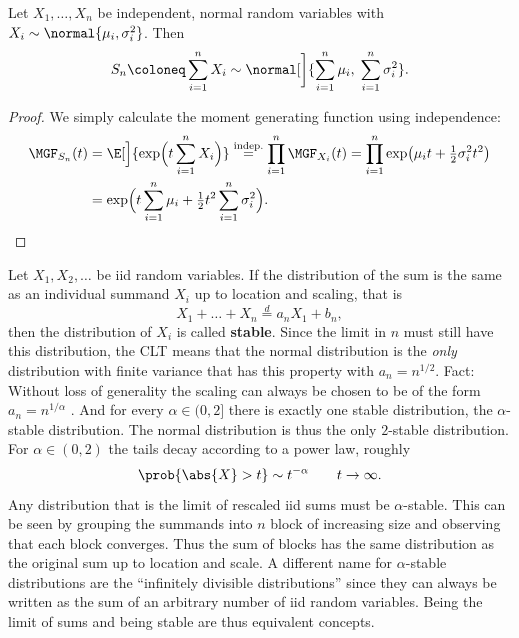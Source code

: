 \begin{lemma}
    \label{lem: sum stability of normal distribution}
    Let \(X_1,\dots, X_n\) be independent, normal random variables with \(X_i
    \sim \normal{\mu_i, \sigma_i^2}\). Then
    \[
        S_n \coloneq \sum_{i=1}^n X_i \sim \normal[\bigg]{\sum_{i=1}^n \mu_i,\; \sum_{i=1}^n \sigma_i^2}.
    \]
\end{lemma}
\begin{proof}
    We simply calculate the moment generating function using independence:
    \[\begin{aligned}[b]
        \MGF_{S_n}(t)
        &= \E[\Big]{\exp\Bigl(t \sum_{i=1}^n X_i\Bigr)}
        \overset{\text{indep.}}= \prod_{i=1}^n \MGF_{X_i}(t)
        = \prod_{i=1}^n \exp\bigl(\mu_i t + \tfrac12 \sigma_i^2 t^2\bigr)
        \\
        &= \exp\Bigl(t \sum_{i=1}^n \mu_i + \tfrac12 t^2 \sum_{i=1}^n \sigma_i^2\Bigr).
    \end{aligned}
    \qedhere
    \]
\end{proof}

\begin{remark}
    Let \(X_1, X_2, \dots\) be iid random variables.  If the distribution of the
    sum is the same as an individual summand \(X_i\) up to location and scaling,
    that is
    \[
        X_1 + \dots + X_n \overset{d} = a_n X_1 + b_n,
    \]
    then the distribution of \(X_i\) is called \textbf{stable}. Since 
    the limit in \(n\) must still have this distribution, the CLT means that the
    normal distribution is the \emph{only} distribution with finite variance
    that has this property with \(a_n = n^{1/2}\). Fact: Without loss of generality the scaling can
    always be chosen to be of the form \(a_n = n^{1/\alpha}\) \citep[Thm.~16.22]{klenkeProbabilityTheoryComprehensive2014}.
    And for every \(\alpha\in (0, 2]\) there is exactly one stable distribution,
    the \(\alpha\)-stable distribution. The normal distribution is thus the
    only \(2\)-stable distribution. For \(\alpha\in (0,2)\) the tails
    decay according to a power law, roughly
    \[
        \prob{\abs{X} >t} \sim t^{-\alpha} \qquad t\to \infty.
    \]
    Any distribution that is the limit of rescaled iid sums must be
    \(\alpha\)-stable. This can be seen by grouping the summands into \(n\)
    block of increasing size and observing that each block converges. Thus the
    sum of blocks has the same distribution as the original sum up to location
    and scale. A different name for \(\alpha\)-stable distributions are the
    ``infinitely divisible distributions'' since they can always be written as
    the sum of an arbitrary number of iid random variables. Being the limit of
    sums and being stable are thus equivalent concepts.
\end{remark}


